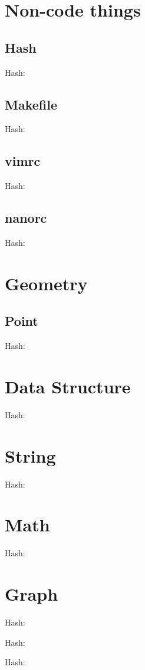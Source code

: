 \documentclass[10pt]{article}
\newcommand{\inputfile}[2]{
    Hash: \texttt{}
    
}
\begin{document}
\begin{multicols*}{3}
    \tableofcontents


    \section{Non-code things}
    \subsection{Hash}
    \inputfile{hash.sh}{txt}
    \subsection{Makefile}
    \inputfile{Makefile}{txt}
    \subsection{vimrc}
    \inputfile{vimrc}{txt}
    \subsection{nanorc}
    \inputfile{nanorc}{txt}

    \section{Geometry}
    \subsection{Point}
    \inputfile{kactl-geometry-point.h}{cpp}
	
	\section{Data Structure}
	\inputfile{data_structure_LCT.cpp}{cpp}
	
	\section{String}
	\inputfile{string_SAM.cpp}{cpp}
	
	\section{Math}
	\inputfile{math_simplex.cpp}{cpp}
	
	\section{Graph}
	\inputfile{graph_clique.cpp}{cpp}
	\inputfile{directed_MST.cpp}{cpp}
	\inputfile{graph_dominator_tree.cpp}{cpp}

\end{multicols*}
\end{document}
